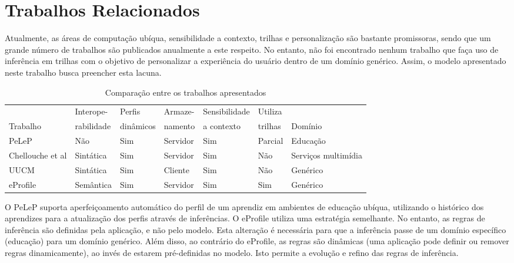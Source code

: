 \documentclass[times, 10pt, twocolumn]{article}
\begin{document}
\section{Trabalhos Relacionados}
\label{ch:relacionados}

Atualmente, as áreas de computação ubíqua, sensibilidade a contexto, trilhas e personalização são bastante promissoras, sendo que um grande número de trabalhos são publicados anualmente a este respeito. No entanto, não foi encontrado nenhum trabalho que faça uso de inferência em trilhas com o objetivo de personalizar a experiência do usuário dentro de um domínio genérico. Assim, o modelo apresentado neste trabalho busca preencher esta lacuna. 

\begin{table}\centering
  \begin{tabular*}{1\textwidth}{@{}lllllll@{}}
    \toprule
                                         & Interope-  & Perfis    & Armaze-  & Sensibilidade & Utiliza & \\
    Trabalho                             & rabilidade & dinâmicos & namento  & a contexto    & trilhas & Domínio \\
    \midrule
    PeLeP                                & Não        & Sim       & Servidor & Sim           & Parcial & Educação \\
    Chellouche et al                     & Sintática  & Sim       & Servidor & Sim           & Não     & Serviços multimídia \\
    UUCM                                 & Sintática  & Sim       & Cliente  & Sim           & Não     & Genérico \\
    eProfile                             & Semântica  & Sim       & Servidor & Sim           & Sim     & Genérico \\
    \bottomrule
  \end{tabular*}
  \caption{Comparação entre os trabalhos apresentados}
  \label{tab:comparacao2}
\end{table}


O PeLeP \cite{pelep} suporta aperfeiçoamento automático do perfil de um aprendiz em ambientes de educação ubíqua, utilizando o histórico dos aprendizes para a atualização dos perfis através de inferências. O eProfile utiliza uma estratégia semelhante. No entanto, as regras de inferência são definidas pela aplicação, e não pelo modelo. Esta alteração é necessária para que a inferência passe de um domínio específico (educação) para um domínio genérico. Além disso, ao contrário do eProfile, as regras são dinâmicas (uma aplicação pode definir ou remover regras dinamicamente), ao invés de estarem pré-definidas no modelo. Isto permite a evolução e refino das regras de inferência.
\end{document}
